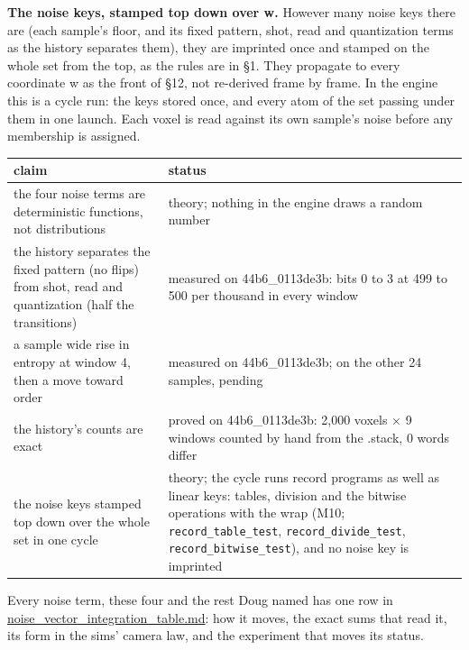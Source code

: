 \textbf{The noise keys, stamped top down over w.} However many noise keys there are (each sample's floor, and its fixed pattern, shot, read and quantization terms as the history separates them), they are imprinted once and stamped on the whole set from the top, as the rules are in §1. They propagate to every coordinate w as the front of §12, not re-derived frame by frame. In the engine this is a cycle run: the keys stored once, and every atom of the set passing under them in one launch. Each voxel is read against its own sample's noise before any membership is assigned.

{\small
\setlength{\tabcolsep}{6pt}
\begin{longtable}{>{\RaggedRight\arraybackslash}p{}>{\RaggedRight\arraybackslash}p{}}
\toprule
claim & status \\
\midrule
\endhead
the four noise terms are deterministic functions, not distributions & theory; nothing in the engine draws a random number \\
the history separates the fixed pattern (no flips) from shot, read and quantization (half the transitions) & measured on 44b6\_\allowbreak{}0113de3b: bits 0 to 3 at 499 to 500 per thousand in every window \\
a sample wide rise in entropy at window 4, then a move toward order & measured on 44b6\_\allowbreak{}0113de3b; on the other 24 samples, pending \\
the history's counts are exact & proved on 44b6\_\allowbreak{}0113de3b: 2,000 voxels × 9 windows counted by hand from the .stack, 0 words differ \\
the noise keys stamped top down over the whole set in one cycle & theory; the cycle runs record programs as well as linear keys: tables, division and the bitwise operations with the wrap (M10; \texttt{record\_\allowbreak{}table\_\allowbreak{}test}, \texttt{record\_\allowbreak{}divide\_\allowbreak{}test}, \texttt{record\_\allowbreak{}bitwise\_\allowbreak{}test}), and no noise key is imprinted \\
\bottomrule
\end{longtable}
}

Every noise term, these four and the rest Doug named has one row in \hyperref[chap:noise-vector-integration-table]{noise\_\allowbreak{}vector\_\allowbreak{}integration\_\allowbreak{}table.md}: how it moves, the exact sums that read it, its form in the sims' camera law, and the experiment that moves its status.


